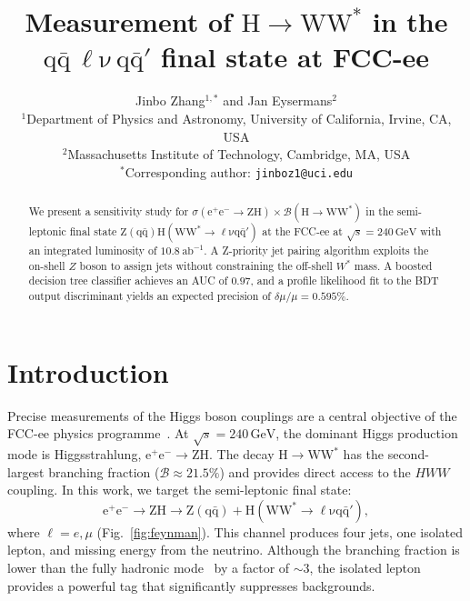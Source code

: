\documentclass[a4paper,11pt]{article}
\newcommand{\sqrts}{\ensuremath{\sqrt{s}}\xspace}
\newcommand{\fbinv}{\ensuremath{\mathrm{ab}^{-1}}\xspace}
\newcommand{\GeV}{\ensuremath{\,\mathrm{GeV}}\xspace}
\newcommand{\ee}{\ensuremath{\mathrm{e^+e^-}}\xspace}
\newcommand{\BR}{\ensuremath{\mathcal{B}}\xspace}
\newcommand{\HWW}{\ensuremath{\mathrm{H} \to \mathrm{WW^*}}\xspace}
\begin{document}
\title{Measurement of $\mathrm{H \to WW^*}$ in the $\mathrm{q\bar{q}\,\ell\nu\,q\bar{q}'}$ final state at FCC-ee}

\author{
Jinbo Zhang$^{1,*}$ and Jan Eysermans$^{2}$\\[6pt]
{\small $^1$Department of Physics and Astronomy, University of California, Irvine, CA, USA}\\
{\small $^2$Massachusetts Institute of Technology, Cambridge, MA, USA}\\[4pt]
{\small $^*$Corresponding author: \texttt{jinboz1@uci.edu}}
}

\date{}
\maketitle
\vspace{-1em}
\raggedbottom

\begin{abstract}
We present a sensitivity study for $\sigma(\ee \to \mathrm{ZH}) \times \BR(\HWW)$ in the semi-leptonic final state $\mathrm{Z(q\bar{q})H(WW^* \to \ell\nu q\bar{q}')}$ at the FCC-ee at $\sqrts = 240\GeV$ with an integrated luminosity of $10.8~\fbinv$.
A Z-priority jet pairing algorithm exploits the on-shell $Z$ boson to assign jets without constraining the off-shell $W^*$ mass.
A boosted decision tree classifier achieves an AUC of $0.97$, and a profile likelihood fit to the BDT output discriminant yields an expected precision of $\delta\mu/\mu = 0.595\%$.
\end{abstract}


\section{Introduction}
\label{sec:introduction}

Precise measurements of the Higgs boson couplings are a central objective of the FCC-ee physics programme~\cite{FCC_CDR}.
At $\sqrts = 240\GeV$, the dominant Higgs production mode is Higgsstrahlung, $\ee \to \mathrm{ZH}$.
The decay $\HWW$ has the second-largest branching fraction ($\BR \approx 21.5\%$) and provides direct access to the $HWW$ coupling.
In this work, we target the semi-leptonic final state:
\begin{equation}
  \ee \to \mathrm{ZH} \to \mathrm{Z(q\bar{q})} + \mathrm{H(WW^* \to \ell\nu q\bar{q}')},
  \label{eq:signal}
\end{equation}
where $\ell = e, \mu$ (Fig.~\ref{fig:feynman}).
This channel produces four jets, one isolated lepton, and missing energy from the neutrino.
Although the branching fraction is lower than the fully hadronic mode~\cite{Eysermans_HWW_hadronic} by a factor of $\sim 3$, the isolated lepton provides a powerful tag that significantly suppresses backgrounds.
\end{document}
